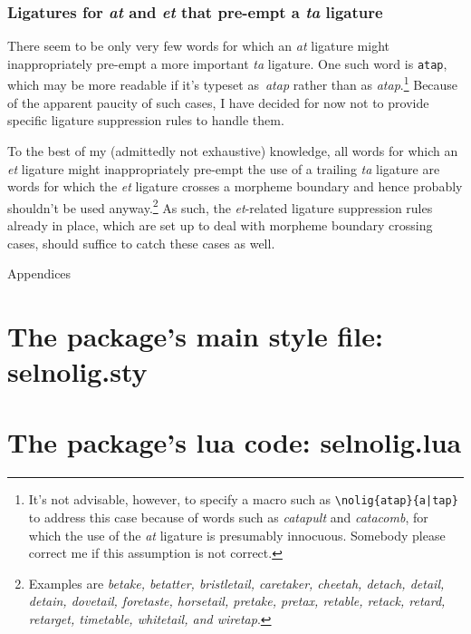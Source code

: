 \documentclass[12pt]{article}
\newcommand{\pkg}[1]{\textsf{#1}}
\newcommand{\opt}[1]{\texttt{#1}}
\let\oldappendix\appendix
\renewcommand\appendix{%
   \clearpage
   \addtocontents{toc}{\protect{\vspace\baselineskip}}
   \addtocontents{toc}{\protect{\mdseries Appendices\par}}
   \noindent
   {\Large Appendices}
   \oldappendix}
\begin{document}
\subsubsection{Ligatures for \emph{at} and \emph{et} that pre-empt a \emph{ta} ligature}

There seem to be only very few words for which an \emph{at} ligature might inappropriately pre-empt a more important \emph{ta} ligature. One such word is \opt{atap}, which may be more readable if it's typeset as~\emph{a\mbox{ta}p} rather than as \emph{atap}.\footnote{It's not advisable, however, to specify a macro such as \Verb+\nolig{atap}{a|tap}+ to address this case because of words such as \emph{catapult} and \emph{catacomb}, for which the use of the \emph{at} ligature is presumably innocuous. Somebody please correct me if this assumption is not correct.}  Because of the apparent paucity of such cases, I have decided for now not to provide specific ligature suppression rules to handle them.

To the best of my (admittedly not exhaustive) knowledge, all words for which an \emph{et} ligature might inappropriately pre-empt the use of a trailing \emph{ta} ligature are words for which the \emph{et} ligature crosses a morpheme boundary and hence probably shouldn't be used anyway.\footnote{Examples are \emph{betake, betatter, bristletail, caretaker, cheetah, detach, detail, detain, dovetail, foretaste, horsetail, pretake, pretax, retable, retack, retard, retarget, timetable, whitetail, \emph{and} wiretap}. } As such, the \emph{et}-related ligature suppression rules already in place, which are set up to deal with morpheme boundary crossing cases, should suffice to catch these cases as well.



\appendix

\small

\section[The package's main style file: selnolig.sty]
{The package's main style file: \pkg{selnolig.sty}}


\clearpage
\section[The package's lua code: selnolig.lua]{The package's lua code: \pkg{selnolig.lua}}
\label{sec:luacode}
\end{document}
